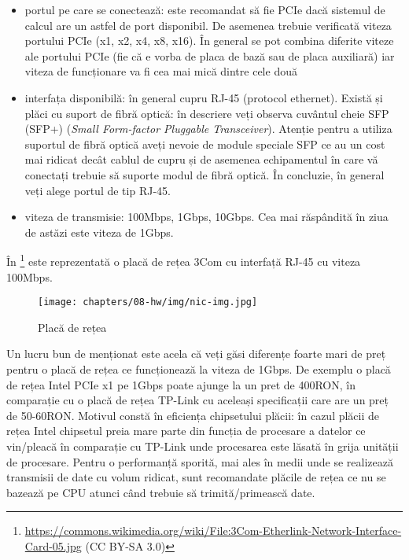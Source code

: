\begin{itemize}
  \item portul pe care se conectează: este recomandat să fie PCIe dacă sistemul de calcul are un astfel de port disponibil.
    De asemenea trebuie verificată viteza portului PCIe (x1, x2, x4, x8, x16).
    În general se pot combina diferite viteze ale portului PCIe (fie că e vorba de placa de bază sau de placa auxiliară) iar viteza de funcționare va fi cea mai mică dintre cele două
  \item interfața disponibilă: în general cupru RJ-45 (protocol ethernet).
    Există și plăci cu suport de fibră optică: în descriere veți observa cuvântul cheie SFP  (SFP+) (\textit{Small Form-factor Pluggable Transceiver}).
    Atenție pentru a utiliza suportul de fibră optică aveți nevoie de module speciale SFP ce au un cost mai ridicat decât cablul de cupru și de asemenea echipamentul în care vă conectați trebuie să suporte modul de fibră optică.
    În concluzie, în general veți alege portul de tip RJ-45.
  \item viteza de transmisie: 100Mbps, 1Gbps, 10Gbps.
    Cea mai răspândită în ziua de astăzi este viteza de 1Gbps.
\end{itemize}

În \footnote{\url{https://commons.wikimedia.org/wiki/File:3Com-Etherlink-Network-Interface-Card-05.jpg} (CC BY-SA 3.0)} este reprezentată o placă de rețea 3Com cu interfață RJ-45 cu viteza 100Mbps.

\begin{figure}[!htbp]
  \centering
  \texttt{[image: chapters/08-hw/img/nic-img.jpg]}
  \caption{Placă de rețea}
  \label{fig:hw:nic}
\end{figure}

Un lucru bun de menționat este acela că veți găsi diferențe foarte mari de preț pentru o placă de rețea ce funcționează la viteza de 1Gbps.
De exemplu o placă de rețea Intel PCIe x1 pe 1Gbps poate ajunge la un pret de 400RON, în comparație cu o placă de rețea TP-Link cu aceleași specificații care are un preț de 50-60RON.
Motivul constă în eficiența chipsetului plăcii: în cazul plăcii de rețea Intel chipsetul preia mare parte din funcția de procesare a datelor ce vin/pleacă în comparație cu TP-Link unde procesarea este lăsată în grija unității de procesare.
Pentru o performanță sporită, mai ales în medii unde se realizează transmisii de date cu volum ridicat, sunt recomandate plăcile de rețea ce nu se bazează pe CPU atunci când trebuie să trimită/primească date.

